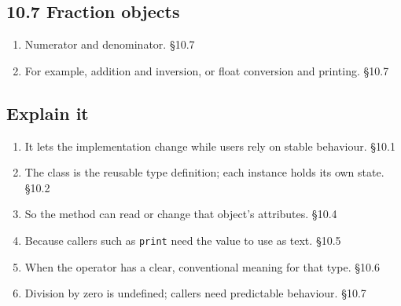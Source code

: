 \documentclass[11pt]{article}
\begin{document}
\begin{keepsection}\subsection{10.7 Fraction objects}

\begin{enumerate}
\item Numerator and denominator. \hfill{\small\color{FAUblue}§10.7}
\item For example, addition and inversion, or float conversion and printing. \hfill{\small\color{FAUblue}§10.7}
\end{enumerate}

\end{keepsection}
\begin{keepsection}\subsection{Explain it}

\begin{enumerate}
\item It lets the implementation change while users rely on stable behaviour. \hfill{\small\color{FAUblue}§10.1}
\item The class is the reusable type definition; each instance holds its own state. \hfill{\small\color{FAUblue}§10.2}
\item So the method can read or change that object’s attributes. \hfill{\small\color{FAUblue}§10.4}
\item Because callers such as \texttt{print} need the value to use as text. \hfill{\small\color{FAUblue}§10.5}
\item When the operator has a clear, conventional meaning for that type. \hfill{\small\color{FAUblue}§10.6}
\item Division by zero is undefined; callers need predictable behaviour. \hfill{\small\color{FAUblue}§10.7}
\end{enumerate}

\end{keepsection}
\end{document}
